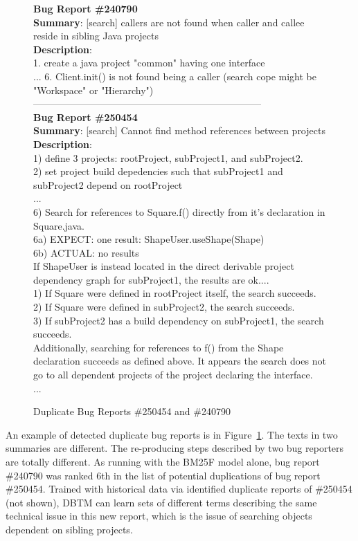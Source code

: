 \begin{figure}[t]
\scriptsize
\sf
\small
\textbf{Bug Report \#240790}\\
\textbf{Summary}: [search] callers are not found when caller and callee reside in sibling Java projects\\
\textbf{Description}:\\
	1. create a java project "common" having one interface\\...
	6. Client.init() is not found being a caller (search cope might be
	"Workspace" or "Hierarchy")\\
-----------------------------------------------------------------------\\
\textbf{Bug Report \#250454}\\
\textbf{Summary}:   [search] Cannot find method references between projects\\
\textbf{Description}:\\
	1) define 3 projects: rootProject, subProject1, and subProject2.\\
	2) set project build depedencies such that subProject1 and subProject2 depend
	on rootProject\\
	...\\
	6) Search for references to Square.f() directly from it's declaration in
	Square.java.\\
			6a) EXPECT: one result: ShapeUser.useShape(Shape)\\
			6b) ACTUAL: no results\\
	If ShapeUser is instead located in the direct derivable project dependency
	graph for subProject1, the results are ok....\\
			1) If Square were defined in rootProject itself, the search succeeds.\\
			2) If Square were defined in subProject2, the search succeeds. \\
			3) If subProject2 has a build dependency on subProject1, the search
	succeeds.\\

	Additionally, searching for references to f() from the Shape declaration
	succeeds as defined above.  It appears the search does not go to all dependent
	projects of the project declaring the interface.\\
	...\\
\caption{Duplicate Bug Reports \#250454 and \#240790}
\label{bugreport250454}
\end{figure}

\vspace{0.04in}
 An example of detected duplicate bug reports 
is in Figure~\ref{bugreport250454}. The texts in two summaries are
different. The re-producing steps described by two bug reporters are
totally different. As running with the BM25F model alone, bug
report \#240790 was ranked 6th in the list of potential duplications
of bug report \#250454. Trained with historical data via identified
duplicate reports of \#250454 (not shown), DBTM can learn sets of
different terms describing the same technical issue in this new
report, which is the issue of searching objects dependent on sibling
projects.

